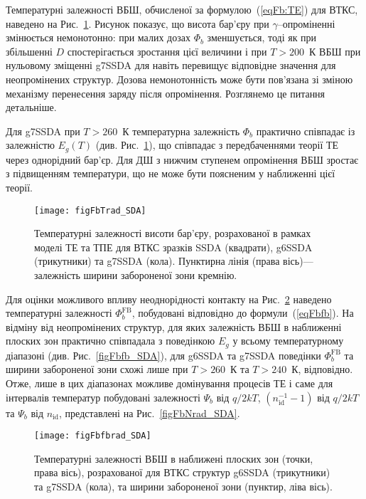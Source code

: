 Температурні залежності ВБШ, обчисленої за формулою~(\ref{eqFb:TE}) для ВТКС, наведено на Рис.~\ref{figFbTrad_SDA}.
Рисунок показує, що висота бар'єру при $\gamma$--опроміненні змінюється немонотонно:
при малих дозах $\Phi_b$ зменшується, тоді як при збільшенні $D$ спостерігається зростання цієї величини і
при $T>200$~К ВБШ при нульовому зміщенні g7SSDA для навіть перевищує відповідне значення для неопромінених структур.
Дозова немонотонність може бути пов'язана зі зміною механізму перенесення заряду після опромінення.
Розглянемо це питання детальніше.

Для g7SSDA при $T>260$~К температурна залежність $\Phi_b$ практично співпадає із залежністю $E_g(T)$ (див. Рис.~\ref{figFbTrad_SDA}),
що співпадає з передбаченнями теорії ТЕ через однорідний бар'єр.
Для ДШ з нижчим ступенем опромінення ВБШ зростає з підвищенням температури, що не може бути поясненим у наближенні цієї теорії.


\begin{figure}
\center
\texttt{[image: figFbTrad\_SDA]}
\caption{\label{figFbTrad_SDA}
Температурні залежності висоти бар'єру, розрахованої в рамках моделі ТЕ та ТПЕ
для ВТКС зразків SSDA (квадрати),
g6SSDA (трикутники) та g7SSDA (кола).
Пунктирна лінія (права вісь)--- залежність ширини забороненої зони кремнію.
}%
\end{figure}


Для оцінки можливого впливу неоднорідності контакту на Рис.~\ref{figFbfbrad_SDA} наведено температурні
залежності  $\Phi_{b}^\mathrm{FB}$, побудовані відповідно до формули~(\ref{eqFbfb}).
На відміну від неопромінених структур, для яких залежність ВБШ в наближенні плоских зон практично співпадала
з поведінкою $E_g$ у всьому температурному діапазоні (див. Рис.~\ref{figFbfb_SDA}),
для g6SSDA  та g7SSDA поведінки $\Phi_{b}^\mathrm{FB}$ та ширини забороненої зони схожі лише при $T>260$~К та $T>240$~К, відповідно.
Отже, лише в цих діапазонах можливе домінування процесів ТЕ і саме для інтервалів температур побудовані
залежності $\Psi_b$ від $q/2kT$, $(n_\mathrm{id}^{-1}-1)$ від $q/2kT$ та $\Psi_b$ від $n_\mathrm{id}$,
представлені на
Рис.~\ref{figFbNrad_SDA}.

\begin{figure}
\center
\texttt{[image: figFbfbrad\_SDA]}
\caption{\label{figFbfbrad_SDA}
Температурні залежності ВБШ в наближені плоских зон (точки, права вісь), розрахованої
для ВТКС структур
g6SSDA (трикутники) та g7SSDA (кола),
та ширини забороненої зони (пунктир, ліва вісь).
}%
\end{figure}



